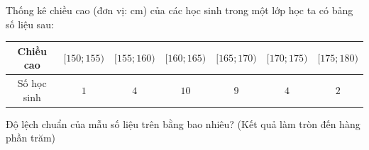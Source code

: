\begin{ex}
Thống kê chiều cao (đơn vị: cm) của các học sinh trong một lớp học ta có bảng số liệu sau:
\begin{center}
\small\setlength{\tabcolsep}{3pt}
\begin{tabular}{|c|c|c|c|c|c|c|}
\hline
Chiều cao & $[150;155)$ & $[155;160)$ & $[160;165)$ & $[165;170)$ & $[170;175)$ & $[175;180)$\\
\hline
Số học sinh & $1$ & $4$ & $10$ & $9$ & $4$ & $2$\\
\hline
\end{tabular}
\end{center}
Độ lệch chuẩn của mẫu số liệu trên bằng bao nhiêu? (Kết quả làm tròn đến hàng phần trăm)
\end{ex}
